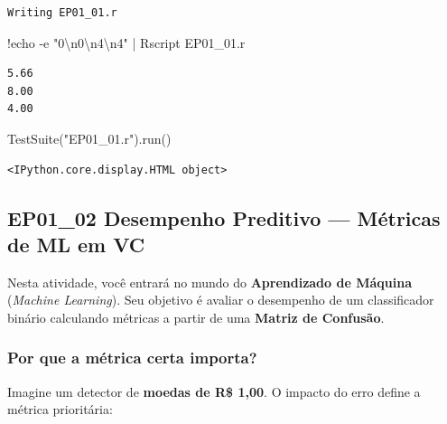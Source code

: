 \documentclass[
  portuguese,
  letterpaper,
  openany,
  oneside,
  12pt,
  a4paper]{book}
\newenvironment{Shaded}{\begin{snugshade}}{\end{snugshade}}
\newcommand{\CharTok}[1]{\textcolor[rgb]{0.13,0.47,0.30}{#1}}
\newcommand{\NormalTok}[1]{\textcolor[rgb]{0.00,0.23,0.31}{#1}}
\newcommand{\OperatorTok}[1]{\textcolor[rgb]{0.37,0.37,0.37}{#1}}
\newcommand{\StringTok}[1]{\textcolor[rgb]{0.13,0.47,0.30}{#1}}
\begin{document}
\begin{verbatim}
Writing EP01_01.r
\end{verbatim}

\begin{Shaded}
\begin{Highlighting}[]
\OperatorTok{!}\NormalTok{echo }\OperatorTok{{-}}\NormalTok{e }\StringTok{"0}\CharTok{\textbackslash{}n}\StringTok{0}\CharTok{\textbackslash{}n}\StringTok{4}\CharTok{\textbackslash{}n}\StringTok{4"} \OperatorTok{|}\NormalTok{ Rscript EP01\_01.r}
\end{Highlighting}
\end{Shaded}

\begin{verbatim}
5.66
8.00
4.00
\end{verbatim}

\begin{Shaded}
\begin{Highlighting}[]
\NormalTok{TestSuite(}\StringTok{"EP01\_01.r"}\NormalTok{).run()}
\end{Highlighting}
\end{Shaded}

\begin{verbatim}
<IPython.core.display.HTML object>
\end{verbatim}

\subsection{\texorpdfstring{EP01\_02  Desempenho
Preditivo --- Métricas de ML em
VC}{EP01\_02  Desempenho Preditivo --- Métricas de ML em VC}}\label{ep01_02-desempenho-preditivo-muxe9tricas-de-ml-em-vc}

Nesta atividade, você entrará no mundo do \textbf{Aprendizado de
Máquina} (\emph{Machine Learning}). Seu objetivo é avaliar o desempenho
de um classificador binário calculando métricas a partir de uma
\textbf{Matriz de Confusão}.

\subsubsection{\texorpdfstring{ Por que a métrica certa
importa?}{ Por que a métrica certa importa?}}\label{por-que-a-muxe9trica-certa-importa}

Imagine um detector de \textbf{moedas de R\$ 1,00}. O impacto do erro
define a métrica prioritária:
\end{document}
